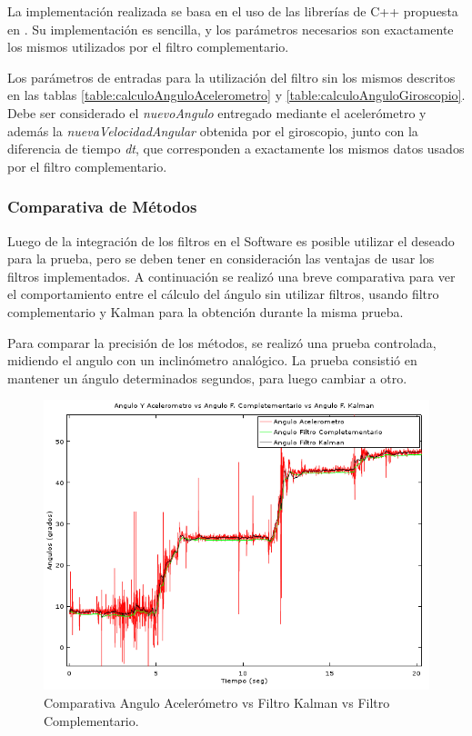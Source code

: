 \documentclass[12pt,a4paper]{article}
\begin{document}
La implementación realizada se basa en el uso de las librerías de C++ propuesta en \cite{kalmanTKJ}. Su implementación es sencilla, y los parámetros necesarios son exactamente los mismos utilizados por el filtro complementario.

Los parámetros de entradas para la utilización del filtro sin los mismos descritos en las tablas \ref{table:calculoAnguloAcelerometro} y \ref{table:calculoAnguloGiroscopio}.
Debe ser considerado el \textit{nuevoAngulo} entregado mediante el acelerómetro y además la \textit{nuevaVelocidadAngular} obtenida por el giroscopio, junto con la diferencia de tiempo \textit{dt}, que corresponden a exactamente los mismos datos usados por el filtro complementario.


\subsubsection{Comparativa de Métodos}
Luego de la integración de los filtros en el Software es posible utilizar el deseado para la prueba, pero se deben tener en consideración las ventajas de usar los filtros implementados. A continuación se realizó una breve comparativa para ver el comportamiento entre el cálculo del ángulo sin utilizar filtros, usando filtro complementario y Kalman para la obtención durante la misma prueba.

\newpage 
Para comparar la precisión de los métodos, se realizó una prueba controlada, midiendo el angulo con un inclinómetro analógico. La prueba consistió en mantener un ángulo determinados segundos, para luego cambiar a otro.
\begin{figure}[H]
	\centering
	\includegraphics[scale=0.9]{images/angKalCom}
	\caption{Comparativa Angulo Acelerómetro vs Filtro Kalman vs Filtro Complementario.}
	\label{fig:AnguloXvsFiltros}
\end{figure}
\end{document}
